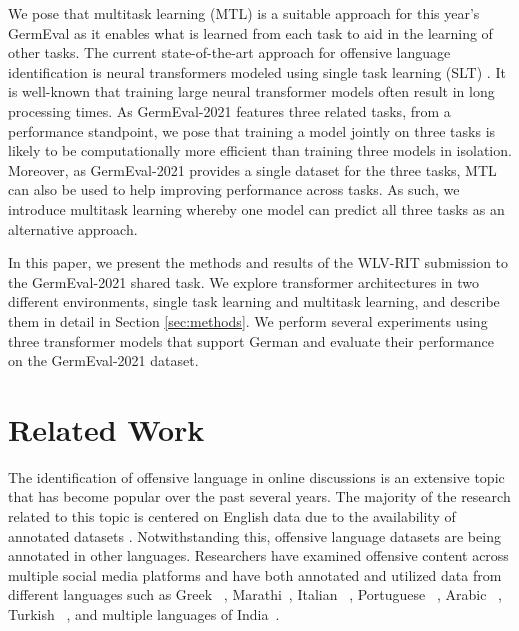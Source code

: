 \documentclass[11pt,a4paper]{article}
\begin{document}
We pose that multitask learning (MTL) is a suitable approach for this year's GermEval as it enables what is learned from each task to aid in the learning of other tasks. The current state-of-the-art approach for offensive language identification is neural transformers modeled using single task learning (SLT) \cite{liu-etal-2019-nuli,ranasinghe-etal-2020-multilingual}. It is well-known that training large neural transformer models often result in long processing times. As GermEval-2021 features three related tasks, from a performance standpoint, we pose that training a model jointly on three tasks is likely to be computationally more efficient than training three models in isolation. Moreover, as GermEval-2021 provides a single dataset for the three tasks, MTL can also be used to help improving performance across tasks. As such, we introduce multitask learning whereby one model can predict all three tasks as an alternative approach.

In this paper, we present the methods and results of the WLV-RIT submission to the GermEval-2021 shared task. We explore transformer architectures in two different environments, single task learning and multitask learning, and describe them in detail in Section \ref{sec:methods}. We perform several experiments using three transformer models that support German and evaluate their performance on the GermEval-2021 dataset.

\section{Related Work}
\label{sec:RW}

The identification of offensive language in online discussions is an extensive topic that has become popular over the past several years. The majority of the research related to this topic is centered on English data due to the availability of annotated datasets \cite{OLID,rosenthal2020}. Notwithstanding this, offensive language datasets are being annotated in other languages. Researchers have examined offensive content across multiple social media platforms and have both annotated and utilized data from different languages such as Greek ~\cite{pitenis2020}, Marathi~\cite{mold}, Italian ~\cite{chiril-etal-2019-multilingual}, Portuguese ~\cite{fortuna2019hierarchically,vargas2021contextual}, Arabic ~\cite{mubarak2020arabic}, Turkish ~\cite{coltekin2020}, and multiple languages of India~\cite{ranasinghe2021MDPI}. 
\end{document}
